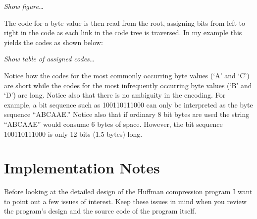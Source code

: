 \documentclass{scrreprt}
\begin{document}
\textit{Show figure\ldots}

The code for a byte value is then read from the root, assigning bits from left to right in the
code as each link in the code tree is traversed. In my example this yields the codes as shown
below:

\textit{Show table of assigned codes\ldots}

Notice how the codes for the most commonly occurring byte values (`A' and `C') are short while
the codes for the most infrequently occurring byte values (`B' and `D') are long. Notice also
that there is no ambiguity in the encoding. For example, a bit sequence such as 100110111000 can
only be interpreted as the byte sequence ``ABCAAE.'' Notice also that if ordinary 8 bit bytes
are used the string ``ABCAAE'' would consume 6 bytes of space. However, the bit sequence
100110111000 is only 12 bits (1.5 bytes) long.

\section{Implementation Notes}

Before looking at the detailed design of the Huffman compression program I want to point out a
few issues of interest. Keep these issues in mind when you review the program's design and the
source code of the program itself.
\end{document}
